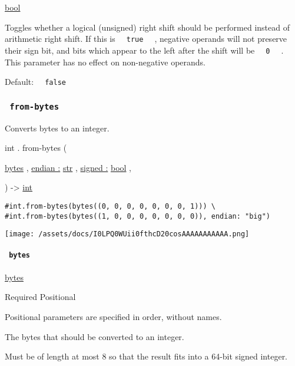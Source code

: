 \href{/docs/reference/foundations/bool/}{bool}

Toggles whether a logical (unsigned) right shift should be performed
instead of arithmetic right shift. If this is
\texttt{\ }{\texttt{\ true\ }}\texttt{\ } , negative operands will not
preserve their sign bit, and bits which appear to the left after the
shift will be \texttt{\ }{\texttt{\ 0\ }}\texttt{\ } . This parameter
has no effect on non-negative operands.

Default: \texttt{\ }{\texttt{\ false\ }}\texttt{\ }

\subsubsection{\texorpdfstring{\texttt{\ from-bytes\ }}{ from-bytes }}\label{definitions-from-bytes}

Converts bytes to an integer.

int { . } { from-bytes } (

{ \href{/docs/reference/foundations/bytes/}{bytes} , } {
\hyperref[definitions-from-bytes-parameters-endian]{endian :}
\href{/docs/reference/foundations/str/}{str} , } {
\hyperref[definitions-from-bytes-parameters-signed]{signed :}
\href{/docs/reference/foundations/bool/}{bool} , }

) -\textgreater{} \href{/docs/reference/foundations/int/}{int}

\begin{verbatim}
#int.from-bytes(bytes((0, 0, 0, 0, 0, 0, 0, 1))) \
#int.from-bytes(bytes((1, 0, 0, 0, 0, 0, 0, 0)), endian: "big")
\end{verbatim}

\texttt{[image: /assets/docs/I0LPQ0WUii0fthcD20cosAAAAAAAAAAA.png]}

\paragraph{\texorpdfstring{\texttt{\ bytes\ }}{ bytes }}\label{definitions-from-bytes-bytes}

\href{/docs/reference/foundations/bytes/}{bytes}

{Required} {{ Positional }}

\label{definitions-from-bytes-bytes-positional-tooltip}
Positional parameters are specified in order, without names.

The bytes that should be converted to an integer.

Must be of length at most 8 so that the result fits into a 64-bit signed
integer.

